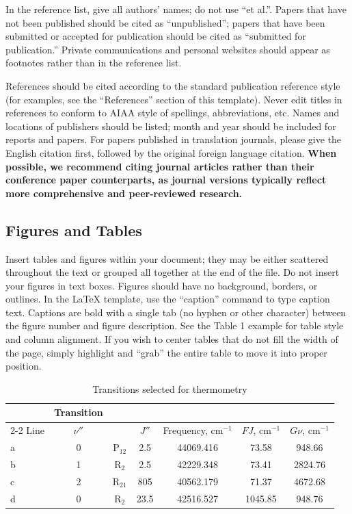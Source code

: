 \documentclass[journal ]{new-aiaa}
\begin{document}
In the reference list, give all authors' names; do not use ``et al.''. Papers that have not been published should be cited as ``unpublished''; papers that have been submitted or accepted for publication should be cited as ``submitted for publication.'' Private communications and personal websites should appear as footnotes rather than in the reference list.

References should be cited according to the standard publication reference style (for examples, see the ``References'' section of this template). Never edit titles in references to conform to AIAA style of spellings, abbreviations, etc. Names and locations of publishers should be listed; month and year should be included for reports and papers. For papers published in translation journals, please give the English citation first, followed by the original foreign language citation. \textbf{When possible, we recommend citing journal articles rather than their conference paper counterparts, as journal versions typically reflect more comprehensive and peer-reviewed research.} 

\subsection{Figures and Tables}
Insert tables and figures within your document; they may be either scattered throughout the text or grouped all together at the end of the file. Do not insert your figures in text boxes. Figures should have no background, borders, or outlines. In the \LaTeX{} template, use the ``caption'' command to type caption text. Captions are bold with a single tab (no hyphen or other character) between the figure number and figure description. See the Table 1 example for table style and column alignment. If you wish to center tables that do not fill the width of the page, simply highlight and “grab” the entire table to move it into proper position.


\begin{table}[hbt!]
\caption{\label{tab:table1} Transitions selected for thermometry}
\centering
\begin{tabular}{lcccccc}
\hline
& Transition& & \multicolumn{2}{c}{}\\\cline{2-2}
Line& $\nu''$& & $J'' $& Frequency, cm$^{-1}$& $FJ$, cm$^{-1}$& $G\nu $, cm$^{-1}$\\\hline
a& 0& P$_{12}$& 2.5& 44069.416& 73.58& 948.66\\
b& 1& R$_{2}$& 2.5& 42229.348& 73.41& 2824.76\\
c& 2& R$_{21}$& 805& 40562.179& 71.37& 4672.68\\
d& 0& R$_{2}$& 23.5& 42516.527& 1045.85& 948.76\\
\hline
\end{tabular}
\end{table}
\end{document}
